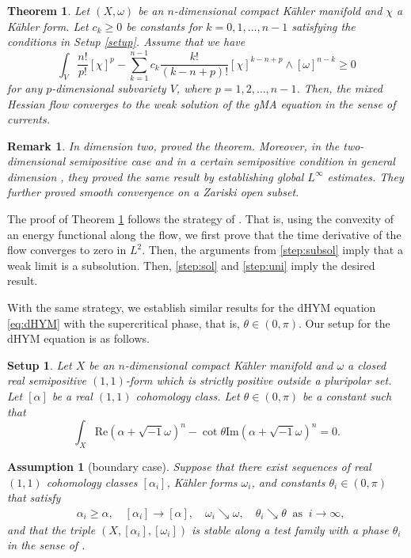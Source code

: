 \documentclass[10pt,a4paper]{amsart}
\numberwithin{equation}{section}
\newtheorem{thm}[equation]{Theorem}
\newtheorem{setup}[equation]{Setup}
\newtheorem{asmp}[equation]{Assumption}
\newtheorem{remark}[equation]{Remark}
\begin{document}
\begin{thm}\label{thm:Hessflow}
    Let $(X,\omega)$ be an $n$-dimensional compact Kähler manifold and $\chi$ a Kähler form. Let $c_k\ge0$ be constants for $k=0,1,\dots,n-1$ satisfying the conditions in Setup \ref{setup}.  Assume that we have
    $$\int_V\frac{n!}{p!}[\chi]^p-\sum_{k=1}^{n-1}c_k\frac{k!}{(k-n+p)!}[\chi]^{k-n+p}\wedge[\omega]^{n-k}\ge0$$
    for any $p$-dimensional subvariety $V$, where $p=1,2,\dots,{n-1}$.
    Then, the mixed Hessian flow converges to the weak solution of the gMA equation in the sense of currents.
\end{thm}

\begin{remark}
    In dimension two, \cite{Mur} proved the theorem. Moreover, in the two-dimensional semipositive case \cite{FLSW} and in a certain semipositive condition in general dimension \cite{Sun23b}, they proved the same result by establishing global $L^\infty$ estimates. They further proved smooth convergence on a Zariski open subset.
\end{remark}
The proof of Theorem \ref{thm:Hessflow} follows the strategy of \cite{Mur}. That is, using the convexity of an energy functional along the flow, we first prove that the time derivative of the flow converges to zero in $L^2$. Then, the arguments from \ref{step:subsol} imply that a weak limit is a subsolution. Then, \ref{step:sol} and \ref{step:uni} imply the desired result.

With the same strategy, we establish similar results for the dHYM equation \eqref{eq:dHYM} with the supercritical phase, that is, $\theta\in(0,\pi)$. Our setup for the dHYM equation is as follows. 

\begin{setup}\label{setup2}
    Let $X$ be an $n$-dimensional compact Kähler manifold and $\omega$ a closed real semipositive $(1,1)$-form which is strictly positive outside a pluripolar set. Let $[\alpha]$ be a real $(1,1)$ cohomology class. Let $\theta\in(0,\pi)$ be a constant such that 
    \begin{equation*}
        \int_X \mathrm{Re}(\alpha+\sqrt{-1}\omega)^n-\cot\theta\mathrm{Im}(\alpha+\sqrt{-1}\omega)^n=0.
    \end{equation*}
\end{setup}
\begin{asmp}[boundary case]\label{asmp:bdrydHYM}
    Suppose that there exist sequences of real $(1,1)$ cohomology classes $[\alpha_i]$, Kähler forms $\omega_i$, and constants $\theta_i\in(0,\pi)$ that satisfy
    \begin{align}
    &\alpha_i\ge\alpha, \quad [\alpha_i]\to[\alpha],\quad \omega_i\searrow \omega,\quad \theta_i\searrow\theta\ \text{ as }\ i\to\infty,
    \end{align}
    and that the triple $(X,[\alpha_i],[\omega_i])$ is stable along a test family with a phase $\theta_i$ in the sense of \cite[Theorem 1.3]{CLT}.
\end{asmp}
\end{document}
